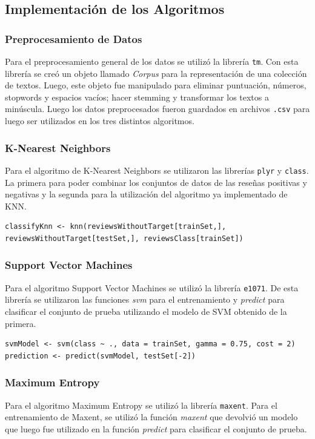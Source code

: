 \documentclass[hidelinks]{sig-alternate-05-2015}
\begin{document}
\subsection{Implementación de los Algoritmos}

\subsubsection{Preprocesamiento de Datos}
Para el preprocesamiento general de los datos se utilizó la librería \texttt{tm}. Con esta librería se creó un objeto llamado \textit{Corpus} para la representación de una colección de textos. Luego, este objeto fue manipulado para eliminar puntuación, números, stopwords y espacios vacíos; hacer stemming y transformar los textos a minúscula. Luego los datos preprocesados fueron guardados en archivos \texttt{.csv} para luego ser utilizados en los tres distintos algoritmos.   

\subsubsection{K-Nearest Neighbors}
Para el algoritmo de K-Nearest Neighbors se utilizaron las librerías \texttt{plyr} y \texttt{class}. La primera para poder combinar los conjuntos de datos de las reseñas positivas y negativas y la segunda para la utilización del algoritmo ya implementado de KNN.

\lstset{language=R}
\begin{lstlisting}
classifyKnn <- knn(reviewsWithoutTarget[trainSet,], reviewsWithoutTarget[testSet,], reviewsClass[trainSet])
\end{lstlisting}

\subsubsection{Support Vector Machines}
Para el algoritmo Support Vector Machines se utilizó la librería \texttt{e1071}. De esta librería se utilizaron las funciones \textit{svm} para el entrenamiento y \textit{predict} para clasificar el conjunto de prueba utilizando el modelo de SVM obtenido de la primera.

\lstset{language=R}
\begin{lstlisting}
svmModel <- svm(class ~ ., data = trainSet, gamma = 0.75, cost = 2)
prediction <- predict(svmModel, testSet[-2])
\end{lstlisting}

\subsubsection{Maximum Entropy}
Para el algoritmo Maximum Entropy se utilizó la librería \texttt{maxent}. Para el entrenamiento de Maxent, se utilizó la función \textit{maxent} que devolvió un modelo que luego fue utilizado en la función \textit{predict} para clasificar el conjunto de prueba.
\end{document}
